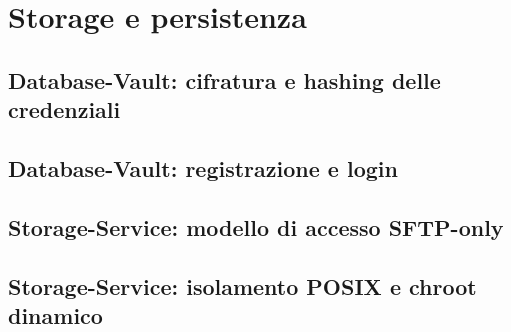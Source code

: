 \chapter{Storage e persistenza}

\section{Database-Vault: cifratura e hashing delle credenziali}

\section{Database-Vault: registrazione e login}

\section{Storage-Service: modello di accesso SFTP-only}

\section{Storage-Service: isolamento POSIX e chroot dinamico}
